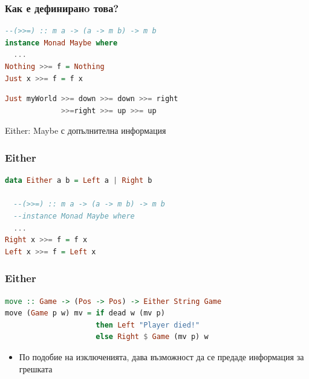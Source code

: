 \documentclass{beamer}
\begin{document}
\begin{frame}[fragile]
  \frametitle{Как е дефиниранo това?}

\begin{lstlisting}[basicstyle=\small,language=Haskell]
--(>>=) :: m a -> (a -> m b) -> m b
instance Monad Maybe where
  ...
Nothing >>= f = Nothing
Just x >>= f = f x
\end{lstlisting}


\begin{lstlisting}[basicstyle=\small,language=Haskell]
Just myWorld >>= down >>= down >>= right 
             >>=right >>= up >>= up
\end{lstlisting}

\end{frame}

\begin{frame}
  \centerline{Either: Maybe с допълнителна информация}
\end{frame}

\begin{frame}[fragile]
  \frametitle{Either}

\begin{lstlisting}[basicstyle=\small,language=Haskell]
data Either a b = Left a | Right b

  --(>>=) :: m a -> (a -> m b) -> m b
  --instance Monad Maybe where
  ...
Right x >>= f = f x
Left x >>= f = Left x
\end{lstlisting}

\end{frame}


\begin{frame}[fragile]
  \frametitle{Either}

\begin{lstlisting}[basicstyle=\small,language=Haskell]
move :: Game -> (Pos -> Pos) -> Either String Game
move (Game p w) mv = if dead w (mv p) 
                     then Left "Player died!" 
                     else Right $ Game (mv p) w
\end{lstlisting}

\begin{itemize}
  \item По подобие на изключенията, дава възможност да се предаде информация за грешката
\end{itemize}

\end{frame}
\end{document}
